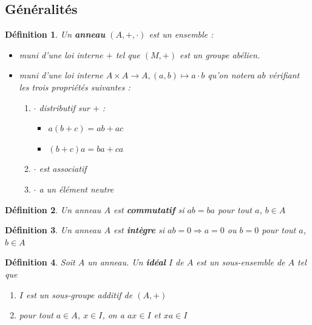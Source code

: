 \documentclass[a4paper,12pt]{report}  %
\theoremstyle{definitionstyle}
\newtheorem{definition}{Définition}[chapter] %
\theoremstyle{examplestyle}
\theoremstyle{remarkstyle}
\theoremstyle{propositionstyle}
\theoremstyle{theoremstyle}
\begin{document}
	\subsection{Généralités}
	
	\begin{definition}
		Un \textbf{anneau} $(A, +, \cdot)$ est un ensemble : 
		\begin{itemize}
			\item muni d'une loi interne $+$ tel que $(M, +)$ est un groupe abélien.
			\item muni d'une loi interne $A \times A \rightarrow A, (a, b) \mapsto a \cdot b$ qu'on notera $ab$ vérifiant les trois propriétés suivantes :
			
			\begin{enumerate}
				\item $\cdot$ distributif sur $+$ :
					\begin{itemize}
						\item $a(b + c) = ab + ac$
						\item $(b+c)a = ba+ca$
					\end{itemize}
				
				
				\item $\cdot$ est associatif
				
				\item $\cdot$ a un élément neutre
			\end{enumerate}
		\end{itemize}
	\end{definition}

	\begin{definition}
		Un anneau $A$ est \textbf{commutatif} si $ab = ba$ pour tout $a$, $b \in A$
	\end{definition}
	
	\begin{definition}
		Un anneau $A$ est \textbf{intègre} si $ab=0 \Rightarrow a = 0$ ou $b = 0$ pour tout $a$, $b \in A$
	\end{definition}

	\begin{definition}
		Soit $A$ un anneau. Un \textbf{idéal} $I$ de $A$ est un sous-ensemble de $A$ tel que
		\begin{enumerate}
			\item $I$ est un sous-groupe additif de $(A, +)$
			\item pour tout $a \in A$, $x \in I$, on a $ax \in I$ et $xa \in I$
		\end{enumerate}
	\end{definition}
\end{document}
